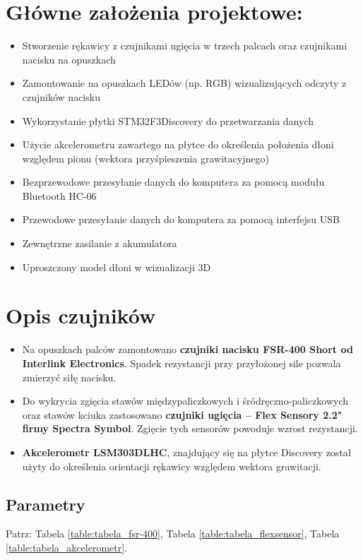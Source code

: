 \documentclass[12pt,a4paper]{article}
\begin{document}
\maketitle
\tableofcontents
\newpage


\section{Główne założenia projektowe: }\normalsize
\begin{itemize}
\item Stworzenie rękawicy z czujnikami ugięcia w trzech palcach oraz czujnikami nacisku na opuszkach
\item Zamontowanie na opuszkach LEDów (np. RGB) wizualizujących odczyty z czujników nacisku
\item Wykorzystanie płytki STM32F3Discovery do przetwarzania danych
\item Użycie akcelerometru zawartego na płytce do określenia położenia dłoni względem pionu (wektora przyśpieszenia grawitacyjnego)
\item Bezprzewodowe przesyłanie danych do komputera za pomocą modułu Bluetooth HC-06
\item Przewodowe przesyłanie danych do komputera za pomocą interfejsu USB
\item Zewnętrzne zasilanie z akumulatora
\item Uproszczony model dłoni w wizualizacji 3D
\end{itemize}

\section{Opis czujników}
\begin{itemize}
\item Na opuszkach palców zamontowano \textbf{czujniki nacisku FSR-400 Short od Interlink Electronics}. Spadek rezystancji przy przyłożonej sile pozwala zmierzyć siłę nacisku.
\item Do wykrycia zgięcia stawów międzypaliczkowych i śródręczno-paliczkowych oraz stawów kciuka zastosowano \textbf{czujniki ugięcia -- Flex Sensory 2.2" firmy Spectra Symbol}. Zgięcie tych sensorów powoduje wzrost rezystancji.
\item \textbf{Akcelerometr LSM303DLHC}, znajdujący się na płytce Discovery został użyty do określenia orientacji rękawicy względem wektora grawitacji.
\end{itemize}
\subsection{Parametry}
Patrz: Tabela \ref{table:tabela_fsr-400}, Tabela \ref{table:tabela_flexsensor}, Tabela \ref{table:tabela_akcelerometr}.
\end{document}

